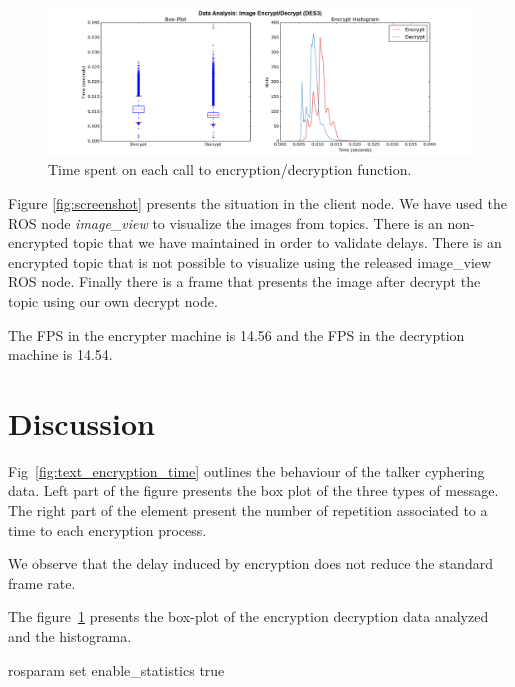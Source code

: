\documentclass[journal,twoside]{JoPhA}
\begin{document}
\begin{figure}[ht]
	\centering
	\includegraphics[width=.49\textwidth]{Outline_images_encryption_decrytiontime2.png}
	\caption{Time spent on each call to encryption/decryption function.}
	\label{fig:images_encryption}
\end{figure}

Figure \ref{fig:screenshot} presents the situation in the client node. We have used the ROS node {\em image\_view} to visualize the images from topics.  There is an non-encrypted topic that we have maintained in order to validate delays. There is an encrypted topic that is not possible to visualize using the released image\_view ROS node. Finally there is a frame that presents the image after decrypt the topic using our own decrypt node. 


The FPS in the encrypter machine is 14.56 and the FPS in the decryption machine is 14.54.



\section{Discussion}

Fig~\ref{fig:text_encryption_time} outlines the behaviour of the talker cyphering data. Left part of the figure presents the box plot of the three types of message. The right part of the element present the number of repetition associated to a time to each encryption process.


We observe that the delay induced by encryption does not reduce the standard frame rate. 

The figure~\ref{fig:images_encryption} presents the box-plot of the encryption decryption data analyzed and the histograma. 

rosparam set enable\_statistics true
\end{document}
